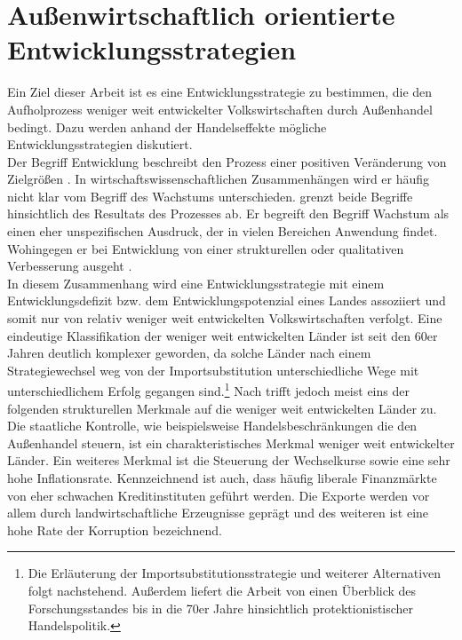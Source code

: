 \chapter[Außenwirtschaftliche Entwicklungsstrategien]{Außenwirtschaftlich orientierte Entwicklungsstrategien}\label{Entwicklungsstrategien}
Ein Ziel dieser Arbeit ist es eine Entwicklungsstrategie zu bestimmen, die den Aufholprozess weniger weit entwickelter Volkswirtschaften durch Außenhandel bedingt. Dazu werden anhand der Handelseffekte mögliche Entwicklungsstrategien diskutiert.\\
%
Der Begriff Entwicklung beschreibt den Prozess einer positiven Veränderung von Zielgrößen \cite[Kapitel 1]{Wagner.1995}. In wirtschaftswissenschaftlichen Zusammenhängen wird er häufig nicht klar vom Begriff des Wachstums unterschieden. \cite{Findlay.1984} grenzt beide Begriffe hinsichtlich des Resultats des Prozesses ab. Er begreift den Begriff Wachstum als einen eher unspezifischen Ausdruck, der in vielen Bereichen Anwendung findet. Wohingegen er bei Entwicklung von einer strukturellen oder qualitativen Verbesserung ausgeht \cite{Findlay.1984}.\\
%
In diesem Zusammenhang wird eine Entwicklungsstrategie mit einem Entwicklungsdefizit bzw. dem Entwicklungspotenzial eines Landes assoziiert und somit nur von relativ weniger weit entwickelten Volkswirtschaften verfolgt. Eine eindeutige Klassifikation der weniger weit entwickelten Länder ist seit den 60er Jahren deutlich komplexer geworden, da solche Länder nach einem Strategiewechsel weg von der Importsubstitution unterschiedliche Wege mit unterschiedlichem Erfolg gegangen sind.\footnote{Die Erläuterung der Importsubstitutionsstrategie und weiterer Alternativen folgt nachstehend. Außerdem liefert die Arbeit von \cite{Stern.1973} einen Überblick des Forschungsstandes bis in die 70er Jahre hinsichtlich protektionistischer Handelspolitik.} Nach \cite{Krugman.2015} trifft jedoch meist eins der folgenden strukturellen Merkmale auf die weniger weit entwickelten Länder zu. Die staatliche Kontrolle, wie beispielsweise Handelsbeschränkungen die den Außenhandel steuern, ist ein charakteristisches Merkmal weniger weit entwickelter Länder. Ein weiteres Merkmal ist die Steuerung der Wechselkurse sowie eine sehr hohe Inflationsrate. Kennzeichnend ist auch, dass häufig liberale Finanzmärkte von eher schwachen Kreditinstituten geführt werden. Die Exporte werden vor allem durch landwirtschaftliche Erzeugnisse geprägt und des weiteren ist eine hohe Rate der Korruption bezeichnend.\\
